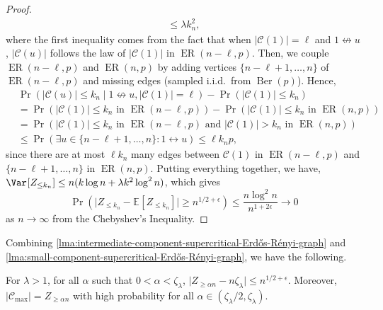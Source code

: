 \begin{proof}
\[\begin{split}
			\leq \lambda k_n^2,
		\end{split}
	\]
	where the first inequality comes from the fact that when \(\lvert \mathcal{C} (1) \rvert = \ell \) and \(1 \not\leftrightarrow u\), \(\lvert \mathcal{C} (u) \rvert \) follows the law of \(\lvert \mathcal{C} (1) \rvert \) in \(\operatorname{ER}(n-\ell , p) \). Then, we couple \(\operatorname{ER}(n-\ell , p) \) and \(\operatorname{ER}(n, p) \) by adding vertices \(\{ n-\ell +1, \dots , n \} \) of \(\operatorname{ER}(n-\ell , p) \) and missing edges (sampled i.i.d.\ from \(\operatorname{Ber}(p) \)). Hence,
	\[
		\begin{split}
			 & \Pr_{}(\lvert \mathcal{C} (u) \rvert \leq k_n \mid 1 \not\leftrightarrow u, \lvert \mathcal{C} (1) \rvert = \ell ) - \Pr_{}(\lvert \mathcal{C} (1) \rvert \leq k_n)               \\
			 & = \Pr_{}(\lvert \mathcal{C} (1) \rvert \leq k_n \text{ in } \operatorname{ER}(n-\ell , p) ) - \Pr_{}(\lvert \mathcal{C} (1) \rvert \leq k_n \text{ in } \operatorname{ER}(n, p) ) \\
			 & = \Pr_{}(\lvert \mathcal{C} (1) \rvert \leq k_n \text{ in } \operatorname{ER}(n-\ell , p) \text{ and } \lvert \mathcal{C} (1) \rvert > k_n \text{ in } \operatorname{ER}(n, p) )  \\
			 & \leq \Pr_{}(\exists u \in \{ n-\ell +1, \dots , n \} \colon 1 \leftrightarrow u)
			\leq \ell k_n p,
		\end{split}
	\]
	since there are at most \(\ell k_n\) many edges between \(\mathcal{C} (1)\) in \(\operatorname{ER}(n-\ell , p) \) and \(\{ n-\ell +1, \dots , n \} \) in \(\operatorname{ER}(n, p) \). Putting everything together, we have, \(\Var_{}[Z_{\leq k_n}] \leq n (k \log n + \lambda k^2 \log ^2 n)\), which gives
	\[
		\Pr_{}(\lvert Z_{\leq k_n} - \mathbb{E}_{}[Z_{\leq k_n}]  \rvert \geq n^{1 / 2 + \epsilon })
		\leq \frac{n \log ^2 n}{n^{1 + 2 \epsilon }}
		\to 0
	\]
	as \(n \to \infty \) from the Chebyshev's Inequality.
\end{proof}

Combining \autoref{lma:intermediate-component-supercritical-Erdős-Rényi-graph} and \autoref{lma:small-component-supercritical-Erdős-Rényi-graph}, we have the following.

\begin{corollary}
	For \(\lambda > 1\), for all \(\alpha \) such that \(0 < \alpha < \zeta _\lambda \), \(\lvert Z_{\geq \alpha n} - n \zeta _\lambda \rvert \leq n^{1 / 2 + \epsilon }\). Moreover, \(\lvert \mathcal{C} _{\max } \rvert = Z_{\geq \alpha n}\) with high probability for all \(\alpha \in (\zeta _\lambda / 2, \zeta _\lambda )\).
\end{corollary}

